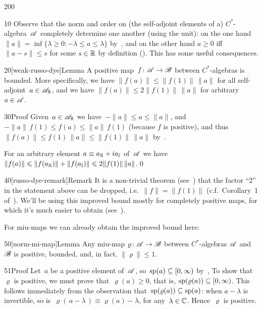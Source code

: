 \begin{parsec}{200}%
\begin{point}{10}%
Observe that the norm and order on 
(the self-adjoint elements of a) $C^*$-algebra~$\mathscr{A}$
completely determine one another (using the unit):
on the one hand
$\|a\|=\inf\{\lambda\geq 0\colon -\lambda\leq a\leq \lambda\}$
by~,
and on the other hand
$a\geq 0$ iff $\|a-s\|\leq s$ for some $s\in\mathbb{R}$
by definition ().
This has some useful consequences.
\end{point}
\begin{point}{20}[weak-russo-dye]{Lemma}%
A positive map~$f\colon \mathscr{A}\to\mathscr{B}$
between $C^*$-algebras
is bounded.
More specifically,
we have
$\|f(a)\|\leq \|f(1)\|\,\|a\|$
for all self-adjoint~$a\in\mathscr{A}_{\mathbb{R}}$,
and we have $\|f(a)\|\leq 2\|f(1)\|\,\|a\|$
for arbitrary $a\in \mathscr{A}$.
\begin{point}{30}{Proof}%
Given~$a\in\mathscr{A}_{\mathbb{R}}$
we have~$-\|a\|\leq a \leq \|a\|$,
and $-\|a\|\,f(1)\leq f(a)\leq \|a\|\,f(1)$
(because $f$ is positive),
and thus~$\|f(a)\|\leq f(1)\,\|a\|\leq \|f(1)\|\,\|a\|$ 
by~.

For an arbitrary element $a\equiv a_{\mathbb{R}}+ia_{\mathbb{I}}$
of~$\mathscr{A}$
we have 
$\|f(a)\|\leqslant \|f(a_{\mathbb{R}})\|+\|f(a_{\mathbb{I}})\|\leqslant 2\|f(1)\|\,\|a\|$.\qed
\end{point}
\begin{point}{40}[russo-dye-remark]{Remark}%
It is a non-trivial theorem (see~)
that the factor ``2'' in the statement above
can be dropped, i.e.~$\|f\|=\|f(1)\|$
(c.f.~Corollary~1 of~\cite{russodye}).
We'll be using this improved bound mostly
for completely positive maps,
for which it's much easier to obtain (see~).

For miu-maps we can already obtain the improved bound here:
\end{point}
\end{point}
\begin{point}{50}[norm-mi-map]{Lemma}%
Any miu-map $\varrho\colon\mathscr{A}\to\mathscr{B}$ 
    between $C^*$-algebras $\mathscr{A}$ and~$\mathscr{B}$
is positive, bounded,
    and, in fact, $\|\varrho\|\leq 1$.
\begin{point}{51}{Proof}%
Let~$a$ be a positive element of~$\mathscr{A}$,
    so~$\mathrm{sp}(a)\subseteq[0,\infty)$ by~,
To show that~$\varrho$ is positive,
we must prove that~$\varrho(a)\geq 0$,
that is, $\mathrm{sp}(\varrho(a))\subseteq[0,\infty)$.
This follows immediately
from the observation that~$\mathrm{sp}(\varrho(a))\subseteq \mathrm{sp}(a)$:
 when $a-\lambda$ is invertible,
so is~$\varrho(\,a-\lambda\,)\equiv\varrho(a)-\lambda$,
for any~$\lambda\in \mathbb{C}$.
Hence~$\varrho$ is positive.


\end{point}
\end{point}
\end{parsec}
